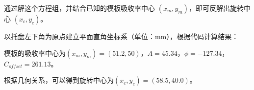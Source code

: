 通过解这个方程组，并结合已知的模板吸收率中心 $(x_m,y_m)$，即可反解出旋转中心 $(x_c,y_c)$。\par

以托盘左下角为原点建立平面直角坐标系（单位：mm），根据代码计算结果：\par
模板的吸收率中心为$(x_m,y_m)=(51.2,50)$，$A=45.34$，$\phi=-127.34$，$C_{offset}=261.13$。\par
根据几何关系，可以得到旋转中心为$(x_c,y_c)=(58.5,40.0)$。









